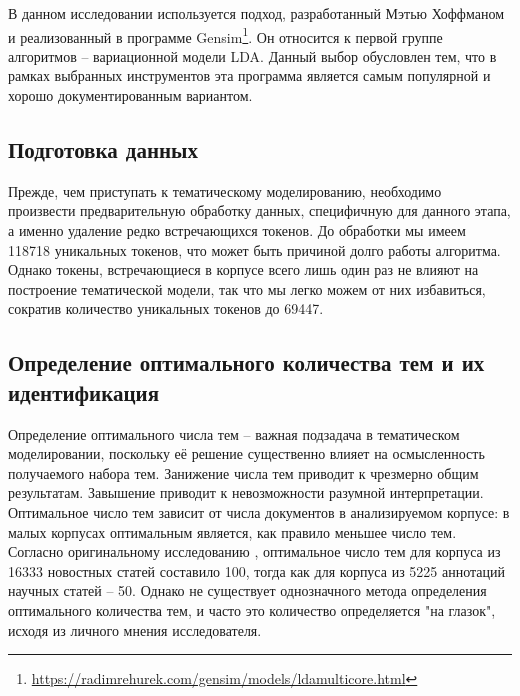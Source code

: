 В данном исследовании используется подход, разработанный Мэтью Хоффманом \cite{HoffmanBB10} и реализованный в программе Gensim\footnote{\href{https://radimrehurek.com/gensim/models/ldamulticore.html}{https://radimrehurek.com/gensim/models/ldamulticore.html}}. Он относится к первой группе алгоритмов -- вариационной модели LDA. Данный выбор обусловлен тем, что в рамках выбранных инструментов эта программа является самым популярной и хорошо документированным вариантом.


\subsection{Подготовка данных}
Прежде, чем приступать к тематическому моделированию, необходимо произвести предварительную обработку данных, специфичную для данного этапа, а именно удаление редко встречающихся токенов. До обработки мы имеем 118718 уникальных токенов, что может быть причиной долго работы алгоритма. Однако токены, встречающиеся в корпусе всего лишь один раз не влияют на построение тематической модели, так что мы легко можем от них избавиться, сократив количество уникальных токенов до 69447.

\subsection{Определение оптимального количества тем и их идентификация}
Определение оптимального числа тем -- важная подзадача в тематическом моделировании, поскольку её решение существенно влияет на осмысленность получаемого набора тем. Занижение числа тем приводит к чрезмерно общим результатам. Завышение приводит к невозможности разумной интерпретации. Оптимальное число тем зависит от числа документов в анализируемом корпусе: в малых корпусах оптимальным является, как правило меньшее число тем. Согласно оригинальному исследованию \cite{LDAOrigin}, оптимальное число тем для корпуса из 16333 новостных статей составило 100, тогда как для корпуса из 5225 аннотаций научных статей -- 50. Однако не существует однозначного метода определения оптимального количества тем, и часто это количество определяется "на глазок", исходя из личного мнения исследователя. 

